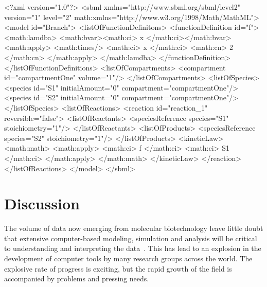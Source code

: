 \documentclass[10pt,twocolumntoc]{cekarticle}
\begin{document}
\begin{example}
<?xml version="1.0"?>
<sbml xmlns="http://www.sbml.org/sbml/level2" version="1" level="2"
      math:xmlns="http://www.w3.org/1998/Math/MathML">
    <model id="Branch">
        <listOfFunctionDefinitons>
            <functionDefinition id="f">
                <math:lamdba>
                    <math:bvar><math:ci> x </math:ci></math:bvar>
                    <math:apply>
                        <math:times/>
                        <math:ci> x </math:ci>
                        <math:cn> 2 </math:cn>
                    </math:apply>
                </math:lamdba>
            </functionDefinition>
        </listOfFunctionDefinitions>
        <listOfCompartments>
            <compartment id="compartmentOne" volume="1"/>
        </listOfCompartments>
        <listOfSpecies>
            <species id="S1" initialAmount="0" compartment="compartmentOne"/>
            <species id="S2" initialAmount="0" compartment="compartmentOne"/>
        </listOfSpecies>
        <listOfReactions>
            <reaction id="reaction_1" reversible="false">
                <listOfReactants>
                    <speciesReference species="S1" stoichiometry="1"/>
                </listOfReactants>
                <listOfProducts>
                    <speciesReference species="S2" stoichiometry="1"/>
                </listOfProducts>
                <kineticLaw>
                    <math:math>
                        <math:apply>
                            <math:ci> f </math:ci>
                            <math:ci> S1 </math:ci>
                         </math:apply>
                    </math:math>
                </kineticLaw>
            </reaction>
        </listOfReactions>
    </model>
</sbml>
\end{example}

\section{Discussion}
\label{sec:discussion}

The volume of data now emerging from molecular biotechnology
leave little doubt that extensive computer-based modeling, simulation and
analysis will be critical to understanding and interpreting the
data~\citep{abbott:1999,gilman:2000,popel:1998,smaglik:2000}.  This
has lead to an explosion in the development of computer tools by many
research groups across the world.  The explosive rate of progress is
exciting, but the rapid growth of the field is accompanied by problems and
pressing needs.
\end{document}
